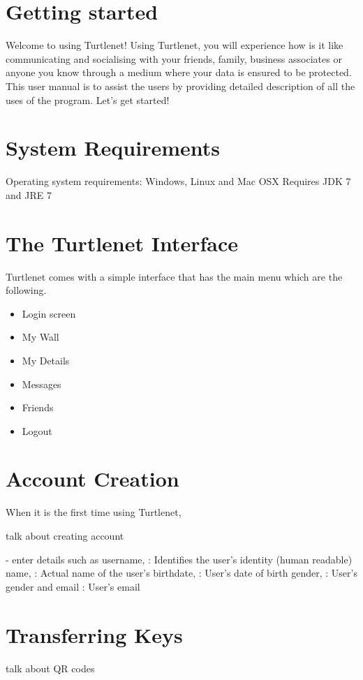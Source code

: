 \section{Getting started}
Welcome to using Turtlenet! Using Turtlenet, you will experience how is it like communicating and socialising with your friends, family, business associates or anyone you know through a medium where your data is ensured to be protected. This user manual is to assist the users by providing detailed description of all the uses of the program. Let's get started!

\section{System Requirements}
Operating system requirements: Windows, Linux and Mac OSX
Requires JDK 7 and JRE 7

\section{The Turtlenet Interface}
Turtlenet comes with a simple interface that has the main menu which are the following.
\begin{itemize}
\item Login screen
\item My Wall
\item My Details
\item Messages
\item Friends
\item Logout
\end{itemize}

\section{Account Creation}
When it is the first time using Turtlenet, 

talk about creating account

- enter details such as 
username, : Identifies the user's identity (human readable)
name, : Actual name of the user's
birthdate, : User's date of birth
gender, : User's gender
and email : User's email

\section{Transferring Keys}
talk about QR codes